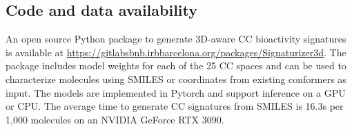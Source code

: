 \subsection{Code and data availability}
\label{Stereoisomers_Code}

An open source Python package to generate 3D-aware CC bioactivity signatures is available at \hyperlink{https://gitlabsbnb.irbbarcelona.org/packages/Signaturizer3d}{https://gitlabsbnb.irbbarcelona.org/packages/Signaturizer3d}. The package includes model weights for each of the 25 CC spaces and can be used to characterize molecules using SMILES or coordinates from existing conformers as input. The models are implemented in Pytorch and support inference on a GPU or CPU. The average time to generate CC signatures from SMILES is 16.3s per 1,000 molecules on an NVIDIA GeForce RTX 3090.

